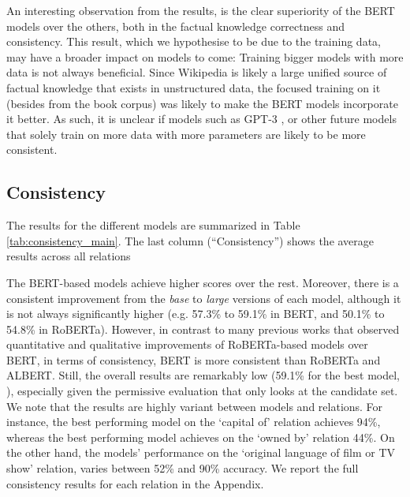 

An interesting observation from the results, is the clear superiority of the BERT models over the others, both in the factual knowledge correctness and consistency. This result, which we hypothesise to be due to the training data, may have a broader impact on models to come: Training bigger models with more data is not always beneficial. Since Wikipedia is likely a large unified source of factual knowledge that exists in unstructured data, the focused training on it (besides from the book corpus) was likely to make the BERT models incorporate it better.
As such, it is unclear if models such as GPT-3 \cite{gpt3}, or other future models that solely train on more data with more parameters are likely to be more consistent.







\subsection{Consistency}

The results for the different models are summarized in Table \ref{tab:consistency_main}.
The last column (``Consistency'') shows the average results across all relations 

The BERT-based models achieve higher scores over the rest. Moreover, there is a consistent improvement from the \textit{base} to \textit{large} versions of each model, although it is not always significantly  higher (e.g. 57.3\% to 59.1\% in BERT, and 50.1\% to 54.8\% in RoBERTa).
However, in contrast to many previous works that observed quantitative and qualitative improvements of RoBERTa-based models over BERT, in terms of consistency, BERT is more consistent than RoBERTa and ALBERT.
Still, the overall results are remarkably low (59.1\% for the best model, ), especially given the permissive evaluation that only looks at the candidate set.
We note that the results are highly variant between models and relations. For instance, the best performing model on the `capital of' relation achieves 94\%, whereas the best performing model achieves on the `owned by' relation 44\%. 
On the other hand, the models' performance on the `original language of film or TV show' relation, varies between 52\% and 90\% accuracy.
We report the full consistency results for each relation in the Appendix.

